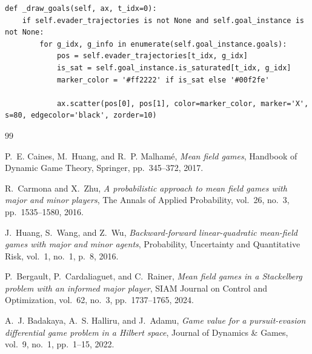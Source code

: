 \documentclass[11pt,a4paper]{article}
\begin{document}
\begin{verbatim}
def _draw_goals(self, ax, t_idx=0):
    if self.evader_trajectories is not None and self.goal_instance is not None:
        for g_idx, g_info in enumerate(self.goal_instance.goals):
            pos = self.evader_trajectories[t_idx, g_idx]
            is_sat = self.goal_instance.is_saturated[t_idx, g_idx]
            marker_color = '#ff2222' if is_sat else '#00f2fe'

            ax.scatter(pos[0], pos[1], color=marker_color, marker='X', s=80, edgecolor='black', zorder=10)
\end{verbatim}

\begin{thebibliography}{99}

P.~E. Caines, M.~Huang, and R.~P. Malham{\'e}, 
\emph{Mean field games}, 
Handbook of Dynamic Game Theory, Springer, pp.~345--372, 2017.

R.~Carmona and X.~Zhu, 
\emph{A probabilistic approach to mean field games with major and minor players}, 
The Annals of Applied Probability, vol.~26, no.~3, pp.~1535--1580, 2016.

J.~Huang, S.~Wang, and Z.~Wu, 
\emph{Backward-forward linear-quadratic mean-field games with major and minor agents}, 
Probability, Uncertainty and Quantitative Risk, vol.~1, no.~1, p.~8, 2016.

P.~Bergault, P.~Cardaliaguet, and C.~Rainer, 
\emph{Mean field games in a Stackelberg problem with an informed major player}, 
SIAM Journal on Control and Optimization, vol.~62, no.~3, pp.~1737--1765, 2024.

A.~J. Badakaya, A.~S. Halliru, and J.~Adamu, 
\emph{Game value for a pursuit-evasion differential game problem in a Hilbert space}, 
Journal of Dynamics \& Games, vol.~9, no.~1, pp.~1--15, 2022.

\end{thebibliography}
\end{document}
